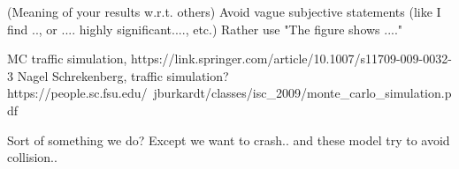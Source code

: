 (Meaning of your results w.r.t. others)
Avoid vague subjective statements (like I find .., or .... highly significant...., etc.)
Rather use "The figure shows ...."


MC traffic simulation, https://link.springer.com/article/10.1007/s11709-009-0032-3
Nagel Schrekenberg, traffic simulation?
https://people.sc.fsu.edu/~jburkardt/classes/isc_2009/monte_carlo_simulation.pdf

Sort of something we do? Except we want to crash.. and these model try to avoid collision..
